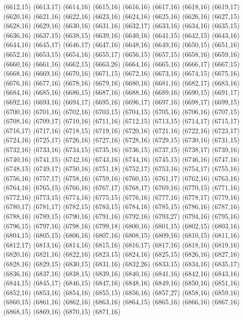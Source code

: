 (6612,15)
(6613,17)
(6614,16)
(6615,16)
(6616,16)
(6617,16)
(6618,16)
(6619,17)
(6620,16)
(6621,16)
(6622,16)
(6623,16)
(6624,16)
(6625,16)
(6626,16)
(6627,15)
(6628,16)
(6629,16)
(6630,16)
(6631,16)
(6632,17)
(6633,16)
(6634,16)
(6635,15)
(6636,16)
(6637,15)
(6638,15)
(6639,16)
(6640,16)
(6641,15)
(6642,15)
(6643,16)
(6644,16)
(6645,17)
(6646,17)
(6647,16)
(6648,16)
(6649,16)
(6650,15)
(6651,16)
(6652,16)
(6653,15)
(6654,16)
(6655,17)
(6656,15)
(6657,15)
(6658,16)
(6659,16)
(6660,16)
(6661,16)
(6662,15)
(6663,26)
(6664,16)
(6665,16)
(6666,17)
(6667,15)
(6668,16)
(6669,16)
(6670,16)
(6671,15)
(6672,16)
(6673,16)
(6674,15)
(6675,16)
(6676,16)
(6677,16)
(6678,16)
(6679,16)
(6680,16)
(6681,16)
(6682,17)
(6683,16)
(6684,16)
(6685,16)
(6686,15)
(6687,16)
(6688,16)
(6689,16)
(6690,15)
(6691,17)
(6692,16)
(6693,16)
(6694,17)
(6695,16)
(6696,17)
(6697,16)
(6698,17)
(6699,15)
(6700,16)
(6701,16)
(6702,16)
(6703,15)
(6704,15)
(6705,16)
(6706,16)
(6707,15)
(6708,16)
(6709,17)
(6710,16)
(6711,16)
(6712,15)
(6713,15)
(6714,17)
(6715,17)
(6716,17)
(6717,16)
(6718,15)
(6719,16)
(6720,16)
(6721,16)
(6722,16)
(6723,17)
(6724,16)
(6725,17)
(6726,16)
(6727,16)
(6728,16)
(6729,15)
(6730,16)
(6731,15)
(6732,16)
(6733,16)
(6734,15)
(6735,16)
(6736,15)
(6737,15)
(6738,17)
(6739,16)
(6740,16)
(6741,15)
(6742,16)
(6743,16)
(6744,16)
(6745,15)
(6746,16)
(6747,16)
(6748,15)
(6749,17)
(6750,16)
(6751,18)
(6752,17)
(6753,16)
(6754,17)
(6755,16)
(6756,16)
(6757,17)
(6758,16)
(6759,16)
(6760,15)
(6761,17)
(6762,16)
(6763,16)
(6764,16)
(6765,15)
(6766,16)
(6767,17)
(6768,17)
(6769,16)
(6770,15)
(6771,16)
(6772,16)
(6773,15)
(6774,16)
(6775,15)
(6776,16)
(6777,16)
(6778,17)
(6779,16)
(6780,17)
(6781,17)
(6782,15)
(6783,15)
(6784,16)
(6785,15)
(6786,16)
(6787,16)
(6788,16)
(6789,15)
(6790,16)
(6791,16)
(6792,16)
(6793,27)
(6794,16)
(6795,16)
(6796,15)
(6797,16)
(6798,16)
(6799,18)
(6800,16)
(6801,15)
(6802,15)
(6803,16)
(6804,15)
(6805,15)
(6806,16)
(6807,16)
(6808,15)
(6809,16)
(6810,15)
(6811,16)
(6812,17)
(6813,16)
(6814,16)
(6815,16)
(6816,17)
(6817,16)
(6818,16)
(6819,16)
(6820,16)
(6821,16)
(6822,16)
(6823,15)
(6824,16)
(6825,15)
(6826,16)
(6827,16)
(6828,16)
(6829,15)
(6830,15)
(6831,16)
(6832,26)
(6833,15)
(6834,16)
(6835,17)
(6836,16)
(6837,16)
(6838,15)
(6839,16)
(6840,16)
(6841,16)
(6842,16)
(6843,16)
(6844,15)
(6845,17)
(6846,15)
(6847,16)
(6848,16)
(6849,16)
(6850,16)
(6851,16)
(6852,16)
(6853,16)
(6854,16)
(6855,15)
(6856,16)
(6857,27)
(6858,16)
(6859,16)
(6860,15)
(6861,16)
(6862,16)
(6863,16)
(6864,15)
(6865,16)
(6866,16)
(6867,16)
(6868,15)
(6869,16)
(6870,15)
(6871,16)
